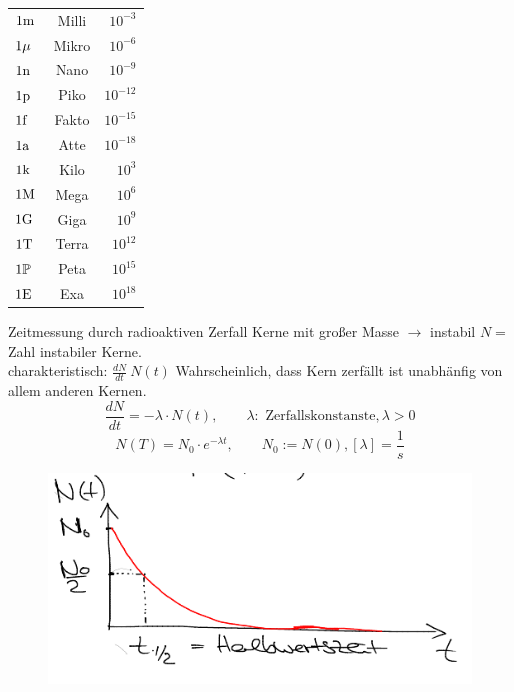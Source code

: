 \documentclass[a4paper,10pt]{scrartcl}
\begin{document}
\begin{enumerate}[a)]
\begin{itemize}
\begin{center}
 \begin{tabular}{l c r}
  $1\m$ & Milli & $10^{-3}$\\
  $1\my$ & Mikro & $ 10^{-6}$\\
 $1\n$ & Nano & $ 10^{-9}$ \\
 $1\p$ & Piko & $ 10^{-12}$\\
 $1\f$ & Fakto & $10^{-15}$\\
 $1\a$ & Atte & $10^{-18}$\\
 $1\k$ & Kilo & $10^3$ \\
 $1\M$ & Mega & $10^6$ \\
 $1\G$ & Giga & $10^9$ \\
 $1\T$ & Terra & $10^12$ \\
 $1\P$ & Peta & $10^15$ \\
 $1\E$ & Exa & $10^18$
 \end{tabular}
\end{center}

 
 Zeitmessung durch radioaktiven Zerfall Kerne mit großer Masse $\rightarrow$ instabil $N=$ Zahl instabiler Kerne. \\
 charakteristisch: $\frac{dN}{dt} ~ N(t)$
 Wahrscheinlich, dass Kern zerfällt ist unabhänfig von allem anderen Kernen.
 \begin{equation}
  \frac{dN}{dt}=-\lambda \cdot N(t), \qquad \lambda: \text{ Zerfallskonstanste}, \lambda>0
 \end{equation}
 \begin{equation}
  N(T)=N_0 \cdot e^{-\lambda t}, \qquad N_0:= N(0), [\lambda]=\frac{1}{s}
 \end{equation}

 \begin{figure}[h]
  \includegraphics[scale=0.5]{fig6.png}
 \end{figure}


\end{itemize}
\end{enumerate}
\end{document}
